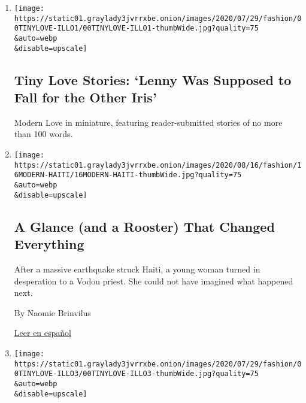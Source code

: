 \begin{enumerate}
\def\labelenumi{\arabic{enumi}.}
\item
  \href{/2020/08/18/style/tiny-modern-love-stories-coronavirus-the-other-iris.html}{}

  \texttt{[image: https://static01.graylady3jvrrxbe.onion/images/2020/07/29/fashion/00TINYLOVE-ILLO1/00TINYLOVE-ILLO1-thumbWide.jpg?quality=75\\\&auto=webp\\\&disable=upscale]}

  \hypertarget{tiny-love-stories-lenny-was-supposed-to-fall-for-the-other-iris}{%
  \subsection{Tiny Love Stories: `Lenny Was Supposed to Fall for the
  Other
  Iris'}\label{tiny-love-stories-lenny-was-supposed-to-fall-for-the-other-iris}}

  Modern Love in miniature, featuring reader-submitted stories of no
  more than 100 words.
\item
  \href{/2020/08/14/style/modern-love-haiti-earthquake-glance-changed-everything.html}{}

  \texttt{[image: https://static01.graylady3jvrrxbe.onion/images/2020/08/16/fashion/16MODERN-HAITI/16MODERN-HAITI-thumbWide.jpg?quality=75\\\&auto=webp\\\&disable=upscale]}

  \hypertarget{a-glance-and-a-rooster-that-changed-everything}{%
  \subsection{A Glance (and a Rooster) That Changed
  Everything}\label{a-glance-and-a-rooster-that-changed-everything}}

  After a massive earthquake struck Haiti, a young woman turned in
  desperation to a Vodou priest. She could not have imagined what
  happened next.

  By Naomie Brinvilus

  \href{https://www.nytimes3xbfgragh.onion/es/2020/08/23/espanol/estilos-de-vida/amor-haiti-gallo.html}{Leer
  en español}
\item
  \href{/2020/08/11/style/tiny-modern-love-stories-coronavirus-what-that-silence-told-me.html}{}

  \texttt{[image: https://static01.graylady3jvrrxbe.onion/images/2020/07/29/fashion/00TINYLOVE-ILLO3/00TINYLOVE-ILLO3-thumbWide.jpg?quality=75\\\&auto=webp\\\&disable=upscale]}

  \hypertarget{tiny-love-stories-i-couldnt-ignore-what-that-silence-told-me}{%
}
\end{enumerate}
